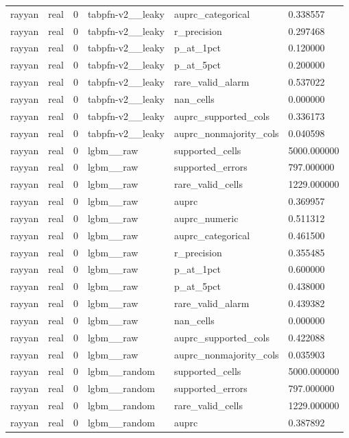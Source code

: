 \begin{tabular}{llllll}
rayyan & real & 0 & tabpfn-v2\_\_leaky & auprc\_categorical & 0.338557 \\
rayyan & real & 0 & tabpfn-v2\_\_leaky & r\_precision & 0.297468 \\
rayyan & real & 0 & tabpfn-v2\_\_leaky & p\_at\_1pct & 0.120000 \\
rayyan & real & 0 & tabpfn-v2\_\_leaky & p\_at\_5pct & 0.200000 \\
rayyan & real & 0 & tabpfn-v2\_\_leaky & rare\_valid\_alarm & 0.537022 \\
rayyan & real & 0 & tabpfn-v2\_\_leaky & nan\_cells & 0.000000 \\
rayyan & real & 0 & tabpfn-v2\_\_leaky & auprc\_supported\_cols & 0.336173 \\
rayyan & real & 0 & tabpfn-v2\_\_leaky & auprc\_nonmajority\_cols & 0.040598 \\
rayyan & real & 0 & lgbm\_\_raw & supported\_cells & 5000.000000 \\
rayyan & real & 0 & lgbm\_\_raw & supported\_errors & 797.000000 \\
rayyan & real & 0 & lgbm\_\_raw & rare\_valid\_cells & 1229.000000 \\
rayyan & real & 0 & lgbm\_\_raw & auprc & 0.369957 \\
rayyan & real & 0 & lgbm\_\_raw & auprc\_numeric & 0.511312 \\
rayyan & real & 0 & lgbm\_\_raw & auprc\_categorical & 0.461500 \\
rayyan & real & 0 & lgbm\_\_raw & r\_precision & 0.355485 \\
rayyan & real & 0 & lgbm\_\_raw & p\_at\_1pct & 0.600000 \\
rayyan & real & 0 & lgbm\_\_raw & p\_at\_5pct & 0.438000 \\
rayyan & real & 0 & lgbm\_\_raw & rare\_valid\_alarm & 0.439382 \\
rayyan & real & 0 & lgbm\_\_raw & nan\_cells & 0.000000 \\
rayyan & real & 0 & lgbm\_\_raw & auprc\_supported\_cols & 0.422088 \\
rayyan & real & 0 & lgbm\_\_raw & auprc\_nonmajority\_cols & 0.035903 \\
rayyan & real & 0 & lgbm\_\_random & supported\_cells & 5000.000000 \\
rayyan & real & 0 & lgbm\_\_random & supported\_errors & 797.000000 \\
rayyan & real & 0 & lgbm\_\_random & rare\_valid\_cells & 1229.000000 \\
rayyan & real & 0 & lgbm\_\_random & auprc & 0.387892 \\

\end{tabular}
